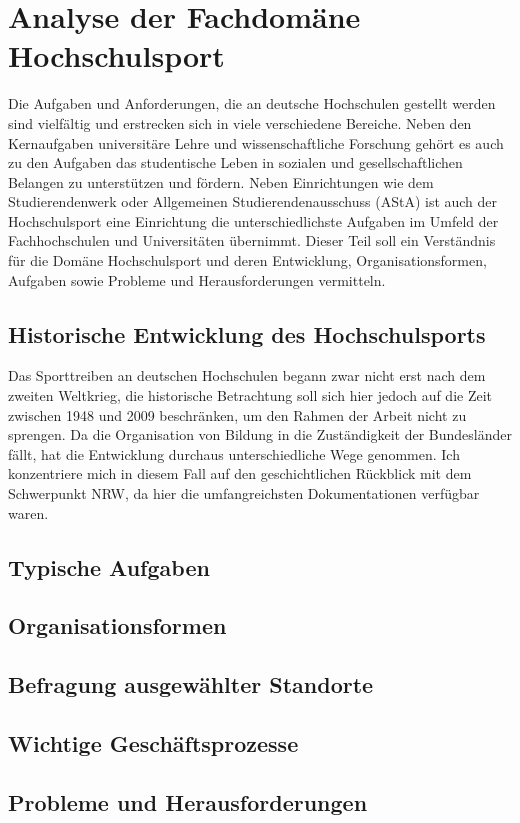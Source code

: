\section{Analyse der Fachdomäne Hochschulsport} 
\label{ch:hochschulsport} 
Die Aufgaben und Anforderungen, die an deutsche Hochschulen gestellt werden sind vielfältig und erstrecken sich in viele verschiedene Bereiche. Neben den Kernaufgaben universitäre Lehre und wissenschaftliche Forschung gehört es auch zu den Aufgaben das studentische Leben in sozialen und gesellschaftlichen Belangen zu unterstützen und fördern. Neben Einrichtungen wie dem Studierendenwerk oder Allgemeinen Studierendenausschuss (AStA) ist auch der Hochschulsport eine Einrichtung die unterschiedlichste Aufgaben im Umfeld der Fachhochschulen und Universitäten übernimmt. Dieser Teil soll ein Verständnis für die Domäne Hochschulsport und deren Entwicklung, Organisationsformen, Aufgaben sowie Probleme und Herausforderungen vermitteln.

\subsection{Historische Entwicklung des Hochschulsports}
Das Sporttreiben an deutschen Hochschulen begann zwar nicht erst nach dem zweiten Weltkrieg, die historische Betrachtung soll sich hier jedoch auf die Zeit zwischen 1948 und 2009 beschränken, um den Rahmen der Arbeit nicht zu sprengen. Da die Organisation von Bildung in die Zuständigkeit der Bundesländer fällt, hat die Entwicklung durchaus unterschiedliche Wege genommen. Ich konzentriere mich in diesem Fall auf den geschichtlichen Rückblick mit dem Schwerpunkt NRW, da hier die umfangreichsten Dokumentationen verfügbar waren. \\


\subsection{Typische Aufgaben}
\subsection{Organisationsformen}
\subsection{Befragung ausgewählter Standorte}
\subsection{Wichtige Geschäftsprozesse}
\subsection{Probleme und Herausforderungen}